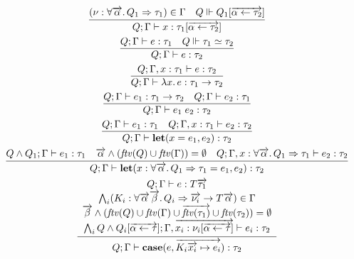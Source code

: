 \begin{gather*}
  \infer{Q; \Gamma \vdash x: \tau_1[\overrightarrow{\alpha \assign \tau_2}]}{
    (\nu: \forall \overrightarrow{\alpha}\ldotp Q_1 \Rightarrow \tau_1) \in \Gamma
    &
    Q \Vdash Q_1[\overrightarrow{\alpha \assign \tau_2}]
  }
  \\
  \infer{Q; \Gamma \vdash e: \tau_2}{
    Q; \Gamma \vdash e: \tau_1
    &
    Q \Vdash \tau_1 \simeq \tau_2
  }
  \\
  \infer{Q; \Gamma \vdash \lambda x\ldotp e: \tau_1 \to \tau_2}{
    Q; \Gamma, x: \tau_1 \vdash e: \tau_2
  }
  \\
  \infer{Q; \Gamma \vdash e_1\; e_2: \tau_2}{
    Q; \Gamma \vdash e_1: \tau_1 \to \tau_2
    &
    Q; \Gamma \vdash e_2: \tau_1
  }
  \\
  \infer{Q; \Gamma \vdash \mathbf{let}(x = e_1, e_2): \tau_2}{
    Q; \Gamma \vdash e_1: \tau_1
    &
    Q; \Gamma, x: \tau_1 \vdash e_2: \tau_2
  }
  \\
  \infer{Q; \Gamma \vdash \mathbf{let}(x: \forall \overrightarrow{\alpha}\ldotp Q_1 \Rightarrow \tau_1 = e_1, e_2): \tau_2}{
    Q \land Q_1; \Gamma \vdash e_1: \tau_1
    &
    \overrightarrow{\alpha} \land (\mathit{ftv}(Q) \cup \mathit{ftv}(\Gamma)) = \emptyset
    &
    Q; \Gamma, x: \forall \overrightarrow{\alpha}\ldotp Q_1 \Rightarrow \tau_1 \vdash e_2: \tau_2
  }
  \\
  \infer{Q; \Gamma \vdash \mathbf{case}(e, \overrightarrow{K_i \overrightarrow{x_i} \mapsto e_i}): \tau_2}{
    \begin{array}{c}
      Q; \Gamma \vdash e: T \overrightarrow{\tau_1}
      \\
      \bigwedge_i (K_i: \forall \overrightarrow{\alpha}\overrightarrow{\beta}\ldotp Q_i \Rightarrow \overrightarrow{\nu_i} \to T \overrightarrow{\alpha}) \in \Gamma
      \\
      \overrightarrow{\beta} \land (\mathit{ftv}(Q) \cup \mathit{ftv}(\Gamma) \cup \overrightarrow{\mathit{ftv}(\tau_1)} \cup \mathit{ftv}(\tau_2)) = \emptyset
      \\
      \bigwedge_i Q \land Q_i[\overrightarrow{\alpha \assign \tau}]; \Gamma, \overrightarrow{x_i: \nu_i[\overrightarrow{\alpha \assign \tau}]} \vdash e_i: \tau_2
    \end{array}
  }
\end{gather*}

